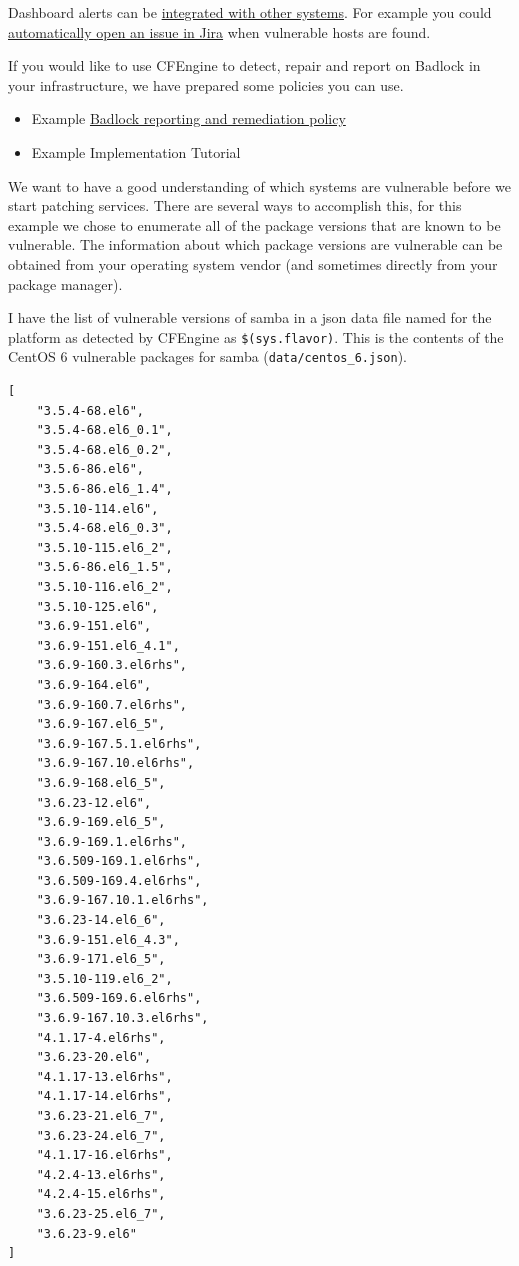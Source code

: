 \documentclass[11pt]{article}
\begin{document}
Dashboard alerts can be \href{https://cfengine.com/learn/integrate-with-other-tools/}{integrated with other systems}. For example you could
\href{https://cfengine.com/learn/ticketing-system-integration-jira/}{automatically open an issue in Jira} when vulnerable hosts are found.

If you would like to use CFEngine to detect, repair and report on Badlock in
your infrastructure, we have prepared some policies you can use.
\begin{itemize}
\item Example \href{https://github.com/nickanderson/cfengine-CVE-2016-2118}{Badlock reporting and remediation policy}
\item Example Implementation Tutorial
\end{itemize}

We want to have a good understanding of which systems are vulnerable before we
start patching services. There are several ways to accomplish this, for this
example we chose to enumerate all of the package versions that are known to be
vulnerable. The information about which package versions are vulnerable can be
obtained from your operating system vendor (and sometimes directly from your
package manager).

I have the list of vulnerable versions of samba in a json data file named for
the platform as detected by CFEngine as \texttt{\$(sys.flavor)}. This is the contents of
the CentOS 6 vulnerable packages for samba (\texttt{data/centos\_6.json}).

\begin{verbatim}
[
    "3.5.4-68.el6",
    "3.5.4-68.el6_0.1",
    "3.5.4-68.el6_0.2",
    "3.5.6-86.el6",
    "3.5.6-86.el6_1.4",
    "3.5.10-114.el6",
    "3.5.4-68.el6_0.3",
    "3.5.10-115.el6_2",
    "3.5.6-86.el6_1.5",
    "3.5.10-116.el6_2",
    "3.5.10-125.el6",
    "3.6.9-151.el6",
    "3.6.9-151.el6_4.1",
    "3.6.9-160.3.el6rhs",
    "3.6.9-164.el6",
    "3.6.9-160.7.el6rhs",
    "3.6.9-167.el6_5",
    "3.6.9-167.5.1.el6rhs",
    "3.6.9-167.10.el6rhs",
    "3.6.9-168.el6_5",
    "3.6.23-12.el6",
    "3.6.9-169.el6_5",
    "3.6.9-169.1.el6rhs",
    "3.6.509-169.1.el6rhs",
    "3.6.509-169.4.el6rhs",
    "3.6.9-167.10.1.el6rhs",
    "3.6.23-14.el6_6",
    "3.6.9-151.el6_4.3",
    "3.6.9-171.el6_5",
    "3.5.10-119.el6_2",
    "3.6.509-169.6.el6rhs",
    "3.6.9-167.10.3.el6rhs",
    "4.1.17-4.el6rhs",
    "3.6.23-20.el6",
    "4.1.17-13.el6rhs",
    "4.1.17-14.el6rhs",
    "3.6.23-21.el6_7",
    "3.6.23-24.el6_7",
    "4.1.17-16.el6rhs",
    "4.2.4-13.el6rhs",
    "4.2.4-15.el6rhs",
    "3.6.23-25.el6_7",
    "3.6.23-9.el6"
]
\end{verbatim}
\end{document}
